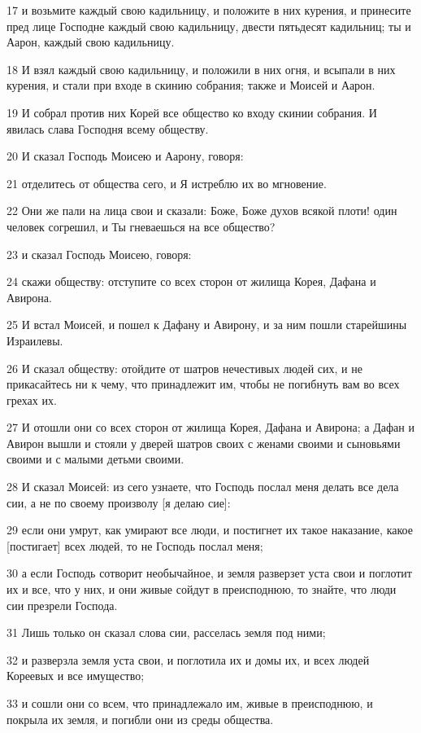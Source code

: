 \par 17 и возьмите каждый свою кадильницу, и положите в них курения, и принесите пред лице Господне каждый свою кадильницу, двести пятьдесят кадильниц; ты и Аарон, каждый свою кадильницу.
\par 18 И взял каждый свою кадильницу, и положили в них огня, и всыпали в них курения, и стали при входе в скинию собрания; также и Моисей и Аарон.
\par 19 И собрал против них Корей все общество ко входу скинии собрания. И явилась слава Господня всему обществу.
\par 20 И сказал Господь Моисею и Аарону, говоря:
\par 21 отделитесь от общества сего, и Я истреблю их во мгновение.
\par 22 Они же пали на лица свои и сказали: Боже, Боже духов всякой плоти! один человек согрешил, и Ты гневаешься на все общество?
\par 23 и сказал Господь Моисею, говоря:
\par 24 скажи обществу: отступите со всех сторон от жилища Корея, Дафана и Авирона.
\par 25 И встал Моисей, и пошел к Дафану и Авирону, и за ним пошли старейшины Израилевы.
\par 26 И сказал обществу: отойдите от шатров нечестивых людей сих, и не прикасайтесь ни к чему, что принадлежит им, чтобы не погибнуть вам во всех грехах их.
\par 27 И отошли они со всех сторон от жилища Корея, Дафана и Авирона; а Дафан и Авирон вышли и стояли у дверей шатров своих с женами своими и сыновьями своими и с малыми детьми своими.
\par 28 И сказал Моисей: из сего узнаете, что Господь послал меня делать все дела сии, а не по своему произволу [я делаю сие]:
\par 29 если они умрут, как умирают все люди, и постигнет их такое наказание, какое [постигает] всех людей, то не Господь послал меня;
\par 30 а если Господь сотворит необычайное, и земля разверзет уста свои и поглотит их и все, что у них, и они живые сойдут в преисподнюю, то знайте, что люди сии презрели Господа.
\par 31 Лишь только он сказал слова сии, расселась земля под ними;
\par 32 и разверзла земля уста свои, и поглотила их и домы их, и всех людей Кореевых и все имущество;
\par 33 и сошли они со всем, что принадлежало им, живые в преисподнюю, и покрыла их земля, и погибли они из среды общества.
